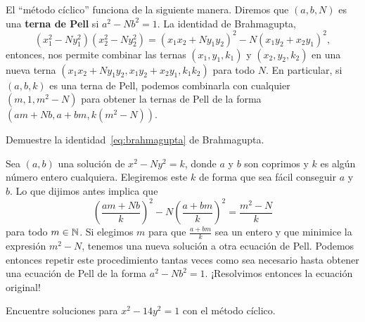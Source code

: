 El ``método cíclico'' funciona de la siguiente manera. 
Diremos que $(a,b,N)$ es una \textbf{terna de Pell}
si $a^2-Nb^2=1$. La identidad de Brahmagupta, 
\begin{equation}
	\label{eq:brahmagupta}
	(x_1^2-Ny_1^2)(x_2^2-Ny_2^2)=(x_1x_2+Ny_1y_2)^2-N(x_1y_2+x_2y_1)^2,
\end{equation}
entonces, nos permite combinar las ternas $(x_1,y_1,k_1)$ y $(x_2,y_2,k_2)$ en
una nueva terna $(x_1x_2+Ny_1y_2,x_1y_2+x_2y_1,k_1k_2)$ para todo $N$. En
particular, si $(a,b,k)$ es una terna de Pell, podemos combinarla con cualquier
$(m,1,m^2-N)$ para obtener la ternas de Pell de la forma
$(am+Nb,a+bm,k(m^2-N))$.

\begin{exercise}
	Demuestre la identidad~\eqref{eq:brahmagupta} de Brahmagupta.
\end{exercise}

Sea $(a,b)$ una solución de $x^2-Ny^2=k$, donde $a$ y $b$ son coprimos y $k$ es
algún número entero cualquiera. Elegiremos este $k$ de forma que sea fácil
conseguir $a$ y $b$. Lo que dijimos antes implica que
\begin{equation}
	\label{eq:Pell_inductive}
	\left(\frac{am+Nb}{k}\right)^2-N\left(\frac{a+bm}{k}\right)^2=\frac{m^2-N}{k}
\end{equation}
para todo $m\in\mathbb{N}$. 
Si elegimos $m$ para que $\frac{a+bm}{k}$ sea un entero y que minimice la
expresión $m^2-N$, tenemos una nueva solución a otra ecuación de Pell. Podemos
entonces repetir este procedimiento tantas veces como sea necesario hasta
obtener una ecuación de Pell de la forma $a^2-Nb^2=1$. ¡Resolvimos entonces la ecuación original!

\begin{exercise}
	Encuentre soluciones para $x^2-14y^2=1$ con el método cíclico. 
\end{exercise}

